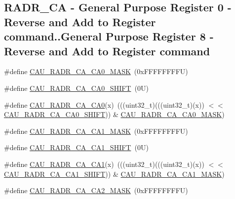 \subsection*{R\+A\+D\+R\+\_\+\+CA -\/ General Purpose Register 0 -\/ Reverse and Add to Register command..General Purpose Register 8 -\/ Reverse and Add to Register command}
\begin{DoxyCompactItemize}
\item 
\#define \mbox{\hyperlink{group___c_a_u___register___masks_ga8839d1ade5765c2f41d1e4666bb039ef}{C\+A\+U\+\_\+\+R\+A\+D\+R\+\_\+\+C\+A\+\_\+\+C\+A0\+\_\+\+M\+A\+SK}}~(0x\+F\+F\+F\+F\+F\+F\+F\+F\+U)
\item 
\#define \mbox{\hyperlink{group___c_a_u___register___masks_ga56a6980d68ebf41b5b321ed2a9211c1e}{C\+A\+U\+\_\+\+R\+A\+D\+R\+\_\+\+C\+A\+\_\+\+C\+A0\+\_\+\+S\+H\+I\+FT}}~(0\+U)
\item 
\#define \mbox{\hyperlink{group___c_a_u___register___masks_gaf2bb47dc97be73cd0c2862fe138900ec}{C\+A\+U\+\_\+\+R\+A\+D\+R\+\_\+\+C\+A\+\_\+\+C\+A0}}(x)~(((uint32\+\_\+t)(((uint32\+\_\+t)(x)) $<$$<$ \mbox{\hyperlink{group___c_a_u___register___masks_ga56a6980d68ebf41b5b321ed2a9211c1e}{C\+A\+U\+\_\+\+R\+A\+D\+R\+\_\+\+C\+A\+\_\+\+C\+A0\+\_\+\+S\+H\+I\+FT}})) \& \mbox{\hyperlink{group___c_a_u___register___masks_ga8839d1ade5765c2f41d1e4666bb039ef}{C\+A\+U\+\_\+\+R\+A\+D\+R\+\_\+\+C\+A\+\_\+\+C\+A0\+\_\+\+M\+A\+SK}})
\item 
\#define \mbox{\hyperlink{group___c_a_u___register___masks_ga7d2e754db6dd6dae2933a852f15a6f60}{C\+A\+U\+\_\+\+R\+A\+D\+R\+\_\+\+C\+A\+\_\+\+C\+A1\+\_\+\+M\+A\+SK}}~(0x\+F\+F\+F\+F\+F\+F\+F\+F\+U)
\item 
\#define \mbox{\hyperlink{group___c_a_u___register___masks_ga1a0bd671ac27226fa5dd3c491a5f74c4}{C\+A\+U\+\_\+\+R\+A\+D\+R\+\_\+\+C\+A\+\_\+\+C\+A1\+\_\+\+S\+H\+I\+FT}}~(0\+U)
\item 
\#define \mbox{\hyperlink{group___c_a_u___register___masks_ga595e87363fbdaccc16d6c649b1895e6b}{C\+A\+U\+\_\+\+R\+A\+D\+R\+\_\+\+C\+A\+\_\+\+C\+A1}}(x)~(((uint32\+\_\+t)(((uint32\+\_\+t)(x)) $<$$<$ \mbox{\hyperlink{group___c_a_u___register___masks_ga1a0bd671ac27226fa5dd3c491a5f74c4}{C\+A\+U\+\_\+\+R\+A\+D\+R\+\_\+\+C\+A\+\_\+\+C\+A1\+\_\+\+S\+H\+I\+FT}})) \& \mbox{\hyperlink{group___c_a_u___register___masks_ga7d2e754db6dd6dae2933a852f15a6f60}{C\+A\+U\+\_\+\+R\+A\+D\+R\+\_\+\+C\+A\+\_\+\+C\+A1\+\_\+\+M\+A\+SK}})
\item 
\#define \mbox{\hyperlink{group___c_a_u___register___masks_ga7fa186d5e73cc29fa76adb228433030e}{C\+A\+U\+\_\+\+R\+A\+D\+R\+\_\+\+C\+A\+\_\+\+C\+A2\+\_\+\+M\+A\+SK}}~(0x\+F\+F\+F\+F\+F\+F\+F\+F\+U)

\end{DoxyCompactItemize}
